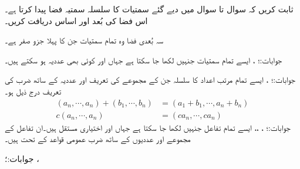 ثابت کریں کہ سوال  تا سوال  میں دیے گئے سمتیات کا سلسلہ سمتیہ فضا پیدا کرتا ہے۔اس فضا کی بُعد اور اساس دریافت کریں۔ 

سہ بُعدی فضا وہ تمام سمتیات جن کا پہلا جزو صفر ہے۔

جوابات:؛ ، 
ایسے تمام سمتیات جنہیں  لکھا جا سکتا ہے جہاں  اور  کوئی بھی عددیہ ہو سکتے ہیں۔

جوابات:؛ ، 
ایسے تمام  مرتب اعداد  کا سلسلہ جن کے مجموعے کی تعریف  اور عددیہ کے ساتھ ضرب کی تعریف درج ذیل ہو۔
\begin{align*}
(a_n,\cdots,a_n)+(b_1,\cdots,b_n)&=(a_1+b_1,\cdots,a_n+b_n)\\
c(a_n,\cdots,a_n)&=(ca_n,\cdots,ca_n)
\end{align*} 
جوابات:؛ ، ،، 
ایسے تمام تفاعل جنہیں  لکھا جا سکتا ہے جہاں  اور  اختیاری مستقل ہیں۔ان تفاعل کے مجموعے اور عددیوں  کے ساتھ ضرب عمومی قواعد کے تحت ہیں۔

جوابات:؛ ، 

